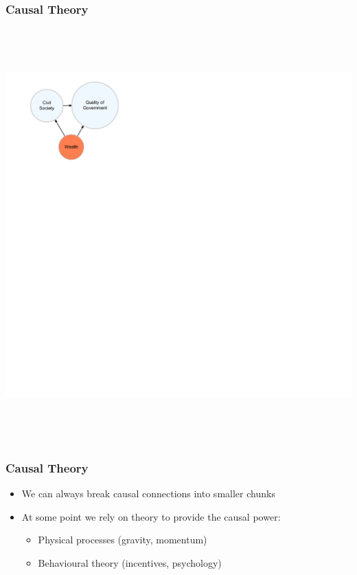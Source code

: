 \documentclass[xcolor=x11names,compress]{beamer}\usepackage[]{graphicx}\usepackage[]{color}
\newenvironment{knitrout}{}{} %
\renewcommand{\(}{\begin{columns}}
\renewcommand{\)}{\end{columns}}
\newcommand{\<}[1]{\begin{column}{#1}}
\renewcommand{\>}{\end{column}}
\begin{document}
\begin{frame}
\frametitle{Causal Theory}
\begin{knitrout}
\color{fgcolor}

{\centering \includegraphics[width=600px,height=600]{figure/unnamed-chunk-4-1} 

}



\end{knitrout}
\end{frame}

\begin{frame}
\frametitle{Causal Theory}
\begin{itemize}
\item We can always break causal connections into smaller chunks
\pause
\item At some point we rely on theory to provide the causal power:
\begin{itemize}
\item Physical processes (gravity, momentum)
\item Behavioural theory (incentives, psychology)
\end{itemize}
\end{itemize}
\end{frame}
\end{document}
